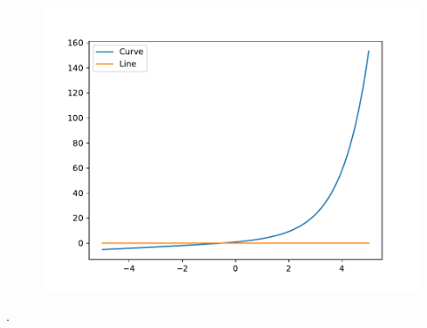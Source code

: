 \begin{frame}
\begin{solution}
		\begin{figure}
			\includegraphics[width=0.5\paperwidth]{p14.pdf}
		\end{figure}
	\end{solution}
\end{frame}

\begin{frame}
	\begin{solution}

		.
	\end{solution}
\end{frame}
